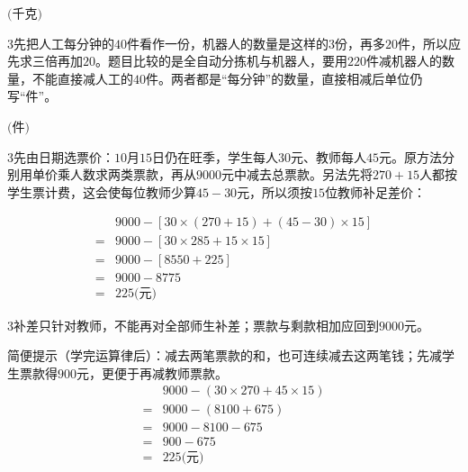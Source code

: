 \documentclass[multi=snippet,border={5bp 20bp 5bp 5bp}]{standalone}
\newenvironment{snippet}[3]{\begin{minipage}{#1bp}\color{answerred}\fontsize{#2}{#3}\selectfont\raggedright}{\end{minipage}}
\begin{document}
\begin{snippet}{80}{10.0}{14}\SourceSans\setlength{\mathindent}{2bp}\(\text{(千克)}\)\end{snippet}
\begin{snippet}{505}{11.5}{14}\begin{multicols}{3}\raggedcolumns 先把人工每分钟的\(40\)\allowbreak 件看作一份，机器人的数量是这样的\(3\)\allowbreak 份，再多\(20\)\allowbreak 件，所以应先求三倍再加\(20\)\allowbreak 。题目比较的是全自动分拣机与机器人，要用\(220\)\allowbreak 件减机器人的数量，不能直接减人工的\(40\)\allowbreak 件。两者都是“每分钟”的数量，直接相减后单位仍写“件”。\end{multicols}\end{snippet}
\begin{snippet}{80}{10.0}{14}\SourceSans\setlength{\mathindent}{2bp}\(\text{(件)}\)\end{snippet}
\begin{snippet}{505}{11.5}{14}\begin{multicols}{3}\raggedcolumns 先由日期选票价：\(10\)\allowbreak 月\(15\)\allowbreak 日仍在旺季，学生每人\(30\)\allowbreak 元、教师每人\(45\)\allowbreak 元。原方法分别用单价乘人数求两类票款，再从\(9000\)\allowbreak 元中减去总票款。另法先将\(270+15\)\allowbreak 人都按学生票计费，这会使每位教师少算\(45-30\)\allowbreak 元，所以须按\(15\)\allowbreak 位教师补足差价：\end{multicols}\[\begin{aligned}&9000-[30\times(270+15)+(45-30)\times15]\\={}&9000-[30\times285+15\times15]\\={}&9000-[8550+225]\\={}&9000-8775\\={}&225\text{(元)}\end{aligned}\]\begin{multicols}{3}\raggedcolumns 补差只针对教师，不能再对全部师生补差；票款与剩款相加应回到\(9000\)\allowbreak 元。\par 简便提示（学完运算律后）：减去两笔票款的和，也可连续减去这两笔钱；先减学生票款得\(900\)\allowbreak 元，更便于再减教师票款。\[\begin{aligned}&9000-(30\times270+45\times15)\\={}&9000-(8100+675)\\={}&9000-8100-675\\={}&900-675\\={}&225\text{(元)}\end{aligned}\]\end{multicols}\end{snippet}
\end{document}
